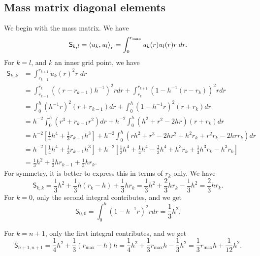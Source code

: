 \documentclass{article}
\begin{document}
\subsection{Mass matrix diagonal elements}

We begin with the mass matrix. We have
\begin{equation}
    \mathsf{S}_{k,l} = \braket{u_k,u_l}_r = \int_0^{r_\text{max}} u_k(r) u_l(r) r \; dr.    
\end{equation}
For $k=l$, and $k$ an inner grid point, we have
\begin{align}
    \mathsf{S}_{k,k} &= \int_{r_{k-1}}^{r_{k+1}} u_k(r)^2 r \; dr \\
    &= \int_{r_{k-1}}^{r_k} ((r-r_{k-1}) h^{-1})^2 r dr + \int_{r_k}^{r_{k+1}} (1 - h^{-1}(r - r_{k}))^2 r dr \\
    &= \int_0^h (h^{-1} r)^2 (r + r_{k-1}) dr + \int_0^h (1 - h^{-1} r)^2 (r + r_{k}) dr \\
    &= h^{-2} \int_0^h (r^3 + r_{k-1} r^2) dr + h^{-2} \int_0^h (h^2 + r^2 - 2 hr)(r + r_k) dr   \\
    &= h^{-2} [ \frac{1}{4} h^4 + \frac{1}{3} r_{k-1} h^3] + h^{-2} \int_0^h (rh^2 + r^3 - 2hr^2 + h^2 r_k + r^2 r_k - 2hr r_k) dr \\
    &= h^{-2} [ \frac{1}{4} h^4 + \frac{1}{3} r_{k-1} h^3] 
    + h^{-2} [ \frac{1}{2}h^4 + \frac{1}{4} h^4 - \frac{2}{3} h^4 + h^3 r_k + \frac{1}{3} h^3 r_k - h^3 r_k ] \\
    & = \frac{1}{3} h^2 + \frac{1}{3} h r_{k-1} + \frac{1}{3} h r_k .
\end{align}
For symmetry, it is better to express this in terms of $r_k$ only. We have
\begin{equation}
    \mathsf{S}_{k,k} = \frac{1}{3} h^2 + \frac{1}{3} h (r_k - h) + \frac{1}{3} h r_k  = \frac{1}{3} h^2 + \frac{2}{3} h r_k - \frac{1}{3} h^2 = \frac{2}{3} h r_k.
\end{equation}
For $k=0$, only the second integral contributes, and we get
\begin{equation}
    \mathsf{S}_{0,0} = \int_0^h (1 - h^{-1} r)^2 r dr = \frac{1}{3} h^2.
\end{equation}

For $k=n+1$, only the first integral contributes, and we get
\begin{equation}
    \mathsf{S}_{n+1,n+1} = \frac{1}{4} h^2 + \frac{1}{3} (r_\text{max}-h) h
 = \frac{1}{4} h^2 + \frac{1}{3} r_\text{max} h - \frac{1}{3} h^2 = \frac{1}{3} r_\text{max} h + \frac{1}{12} h^2.
\end{equation}
\end{document}
